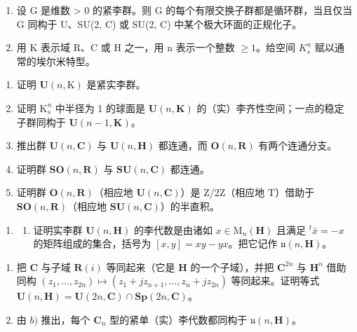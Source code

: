 
\begin{enumerate}
\def\labelenumi{\arabic{enumi})}
\item
  设 G 是维数 \textgreater{} 0 的紧李群。则 G 的每个有限交换子群都是循环群，当且仅当 G 同构于 U、SU(2, C) 或 SU(2, C) 中某个极大环面的正规化子。
\item
  用 K 表示域 R、C 或 H 之一，用 n 表示一个整数 \(\geq 1\)。给空间 \(K_{s}^{n}\) 赋以通常的埃尔米特型。
\end{enumerate}

\begin{enumerate}
\def\labelenumi{\alph{enumi})}
\item
  证明 \(\mathbf{U}(n,\mathrm{K})\) 是紧实李群。
\item
  证明 \(\mathrm{K}_s^n\) 中半径为 1 的球面是 \(\mathbf{U}(n,\mathbf{K})\) 的（实）李齐性空间；一点的稳定子群同构于 \(\mathbf{U}(n - 1,\mathbf{K})\)。
\item
  推出群 \(\mathbf{U}(n,\mathbf{C})\) 与 \(\mathbf{U}(n,\mathbf{H})\) 都连通，而 \(\mathbf{O}(n,\mathbf{R})\) 有两个连通分支。
\item
  证明群 \(\mathbf{SO}(n,\mathbf{R})\) 与 \(\mathbf{SU}(n,\mathbf{C})\) 都连通。
\item
  证明群 \(\mathbf{O}(n,\mathbf{R})\)（相应地 \(\mathbf{U}(n,\mathbf{C})\)）是 Z/2Z（相应地 T）借助于 \(\mathbf{SO}(n,\mathbf{R})\)（相应地 \(\mathbf{SU}(n,\mathbf{C})\)）的半直积。
\end{enumerate}

\begin{enumerate}
\def\labelenumi{\arabic{enumi})}
\setcounter{enumi}{2}
\tightlist
\item
  \begin{enumerate}
  \def\labelenumii{\alph{enumii})}
  \tightlist
  \item
    证明实李群 \(\mathbf{U}(n, \mathbf{H})\) 的李代数是由诸如 \(x \in \mathrm{M}_n(\mathbf{H})\) 且满足 \(^t\bar{x} = -x\) 的矩阵组成的集合，括号为 \([x, y] = xy - yx\)。把它记作 \(\mathfrak{u}(n, \mathbf{H})\)。
  \end{enumerate}
\end{enumerate}

\begin{enumerate}
\def\labelenumi{\alph{enumi})}
\setcounter{enumi}{1}
\item
  把 \(\mathbf{C}\) 与子域 \(\mathbf{R}(i)\) 等同起来（它是 \(\mathbf{H}\) 的一个子域），并把 \(\mathbf{C}^{2n}\) 与 \(\mathbf{H}^n\) 借助同构 \((z_1, \ldots, z_{2n}) \mapsto (z_1 + jz_{n+1}, \ldots, z_n + jz_{2n})\) 等同起来。证明等式 \(\mathbf{U}(n, \mathbf{H}) = \mathbf{U}(2n, \mathbf{C}) \cap \mathbf{Sp}(2n, \mathbf{C})\)。
\item
  由 \(b)\) 推出，每个 \(\mathbf{C}_n\) 型的紧单（实）李代数都同构于 \(\mathfrak{u}(n, \mathbf{H})\)。
\end{enumerate}

